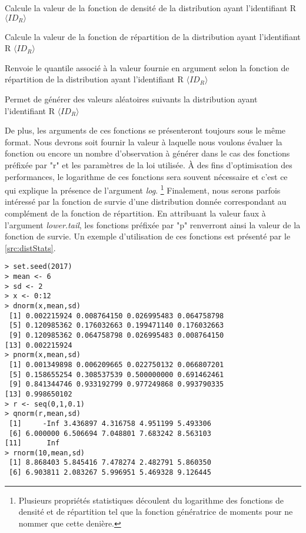 \begin{description}[style=multiline,leftmargin=2cm]
	\item[$d\langle ID_R \rangle$] Calcule la valeur de la fonction de densité de la distribution ayant l'identifiant R $\langle ID_R \rangle$
	\item[$p\langle ID_R \rangle$] Calcule la valeur de la fonction de répartition de la distribution ayant l'identifiant R $\langle ID_R \rangle$
	\item[$q\langle ID_R \rangle$] Renvoie le quantile associé à la valeur fournie en argument selon  la fonction de répartition de la distribution ayant l'identifiant R $\langle ID_R \rangle$
	\item[$r\langle ID_R \rangle$] Permet de générer des valeurs aléatoires suivants la distribution ayant l'identifiant R $\langle ID_R \rangle$
\end{description}

\noindent
De plus, les arguments de ces fonctions se présenteront toujours sous le même format. Nous devrons soit fournir la valeur à laquelle nous voulons évaluer la fonction ou encore un nombre d'observation à générer dans le cas des fonctions préfixée par "r" et les paramètres de la loi utilisée. À des fins d'optimisation des performances, le logarithme de ces fonctions sera souvent nécessaire et c'est ce qui explique la présence de l'argument \emph{log}. \footnote{Plusieurs propriétés statistiques découlent du logarithme des fonctions de densité et de répartition tel que la fonction génératrice de moments pour ne nommer que cette denière.} Finalement, nous serons parfois intéressé par la fonction de survie d'une distribution donnée correspondant au complément de la fonction de répartition. En attribuant la valeur faux à l'argument \emph{lower.tail}, les fonctions préfixée par "p" renverront ainsi la valeur de la fonction de survie. Un exemple d'utilisation de ces fonctions est présenté par le \autoref{src:distStats}. \\

\begin{lstlisting}[caption = Fonctions relatives à la distribution Normale,label=src:distStats]
> set.seed(2017)
> mean <- 6
> sd <- 2
> x <- 0:12
> dnorm(x,mean,sd)
 [1] 0.002215924 0.008764150 0.026995483 0.064758798
 [5] 0.120985362 0.176032663 0.199471140 0.176032663
 [9] 0.120985362 0.064758798 0.026995483 0.008764150
[13] 0.002215924
> pnorm(x,mean,sd)
 [1] 0.001349898 0.006209665 0.022750132 0.066807201
 [5] 0.158655254 0.308537539 0.500000000 0.691462461
 [9] 0.841344746 0.933192799 0.977249868 0.993790335
[13] 0.998650102
> r <- seq(0,1,0.1)
> qnorm(r,mean,sd)
 [1]     -Inf 3.436897 4.316758 4.951199 5.493306
 [6] 6.000000 6.506694 7.048801 7.683242 8.563103
[11]      Inf
> rnorm(10,mean,sd)
 [1] 8.868403 5.845416 7.478274 2.482791 5.860350
 [6] 6.903811 2.083267 5.996951 5.469328 9.126445
\end{lstlisting}


